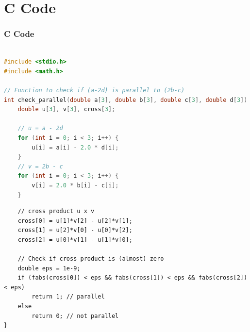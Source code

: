\documentclass{beamer}
\theoremstyle{remark}
\numberwithin{equation}{section}
\begin{document}
\section{C Code}
\begin{frame}[fragile]
\frametitle{C Code }
\begin{lstlisting}[language=C]

#include <stdio.h>
#include <math.h>

// Function to check if (a-2d) is parallel to (2b-c)
int check_parallel(double a[3], double b[3], double c[3], double d[3]) {
    double u[3], v[3], cross[3];

    // u = a - 2d
    for (int i = 0; i < 3; i++) {
        u[i] = a[i] - 2.0 * d[i];
    }
    // v = 2b - c
    for (int i = 0; i < 3; i++) {
        v[i] = 2.0 * b[i] - c[i];
    }
\end{lstlisting}
\end{frame}
\begin{frame}[fragile]
\begin{lstlisting}
    // cross product u x v
    cross[0] = u[1]*v[2] - u[2]*v[1];
    cross[1] = u[2]*v[0] - u[0]*v[2];
    cross[2] = u[0]*v[1] - u[1]*v[0];

    // Check if cross product is (almost) zero
    double eps = 1e-9;
    if (fabs(cross[0]) < eps && fabs(cross[1]) < eps && fabs(cross[2]) < eps)
        return 1; // parallel
    else
        return 0; // not parallel
}
    
\end{lstlisting}
\end{frame}
\end{document}
